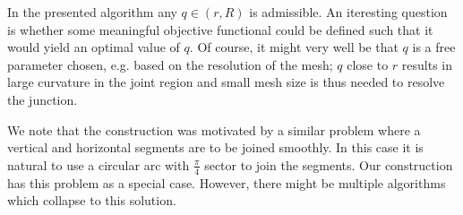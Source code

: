 In the presented algorithm any $q\in(r, R)$ is admissible. An iteresting
question is whether some meaningful objective functional could be defined such 
that it would yield an optimal value of $q$. Of course, it might very well be
that $q$ is a free parameter chosen, e.g. based on the resolution of the mesh; $q$
close to $r$ results in large curvature in the joint region and small mesh size
is thus needed to resolve the junction.

We note that the construction was motivated by a similar problem where a
vertical and horizontal segments are to be joined smoothly. In this case it is
natural to use a circular arc with $\tfrac{\pi}{4}$ sector to join the segments.
Our construction has this problem as a special case. However, there might be
multiple algorithms which collapse to this solution.

